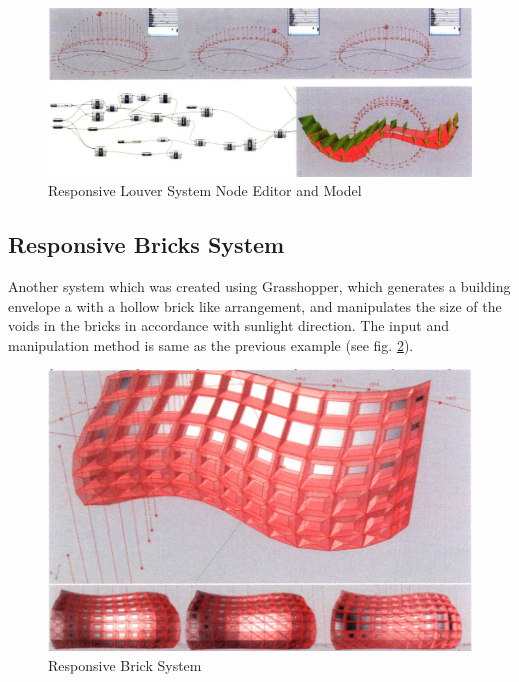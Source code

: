 \begin{figure}
\centering
\includegraphics[width=20cm]{./Images/34-RLS3}
\caption[Responsive Louver System Node Editor and Model]{Responsive Louver System Node Editor and Model \cite{yi09}}
\label{fig:RLS3}
\end{figure}

\subsection{Responsive Bricks System}

Another system which was created using Grasshopper, which generates a building envelope a with a hollow brick like arrangement, and manipulates the size of the voids in the bricks in accordance with sunlight direction. The input and manipulation method is same as the previous example (see fig. \ref{fig:RBS}).

\begin{figure}[htbp]
\centering
\includegraphics[width=\textwidth]{./Images/35-RBS}
\caption[Responsive Brick System]{Responsive Brick System \cite{yi09}}
\label{fig:RBS}
\end{figure}
 
